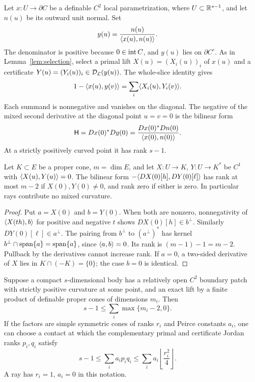 Let $x:U\to\partial C$ be a definable $C^2$ local parametrization, where
$U\subset\mathbb R^{s-1}$, and let $n(u)$ be its outward unit normal. Set
\[
 y(u)=\frac{n(u)}{\langle x(u),n(u)\rangle}.
\]
The denominator is positive because $0\in\operatorname{int} C$, and $y(u)$ lies on
$\partial C^\circ$. As in Lemma~\ref{lem:selection}, select a primal
lift $X(u)=(X_i(u))_i$ of $x(u)$ and a certificate
$Y(u)=(Y_i(u))_i\in\mathcal D_{\mathcal L}(y(u))$. The whole-slice identity gives
\begin{equation}\label{eq:local-slack}
 1-\langle x(u),y(v)\rangle=\sum_i\langle X_i(u),Y_i(v)\rangle.
\end{equation}
Each summand is nonnegative and vanishes on the diagonal. The negative of
the mixed second derivative at the diagonal point $u=v=0$ is the bilinear
form
\begin{equation}\label{eq:mixed-curvature}
 \mathsf H=Dx(0)^*Dy(0)
 =\frac{Dx(0)^*Dn(0)}{\langle x(0),n(0)\rangle}.
\end{equation}
At a strictly positively curved point it has rank $s-1$.

\begin{lemma}\label{lem:universal-channel}
Let $K\subset E$ be a proper cone, $m=\dim E$, and let
$X:U\to K$, $Y:U\to K^*$ be $C^1$ with
$\langle X(u),Y(u)\rangle=0$. The bilinear form
$-\langle DX(0)[h],DY(0)[\ell]\rangle$ has rank at most $m-2$ if
$X(0),Y(0)\ne0$, and rank zero if either is zero. In particular rays
contribute no mixed curvature.
\end{lemma}
\begin{proof}
Put $a=X(0)$ and $b=Y(0)$. When both are nonzero, nonnegativity of
$\langle X(th),b\rangle$ for positive and negative $t$ shows $DX(0)[h]\in b^\perp$.
Similarly $DY(0)[\ell]\in a^\perp$. The pairing from $b^\perp$ to
$(a^\perp)^*$ has kernel
$b^\perp\cap\operatorname{span}\{a\}=\operatorname{span}\{a\}$, since $\langle a,b\rangle=0$.
Its rank is $(m-1)-1=m-2$. Pullback by the derivatives cannot increase
rank. If $a=0$, a two-sided derivative of $X$ lies in $K\cap(-K)=\{0\}$;
the case $b=0$ is identical.
\end{proof}

\begin{theorem}\label{thm:curvature}
Suppose a compact $s$-dimensional body has a relatively open $C^2$
boundary patch with strictly positive curvature at some point, and an
exact lift by a finite product of definable proper cones of dimensions
$m_i$. Then
\begin{equation}\label{eq:universal-capacity}
 s-1\leq\sum_i\max\{m_i-2,0\}.
\end{equation}
If the factors are simple symmetric cones of ranks $r_i$ and Peirce
constants $a_i$, one can choose a contact at which the complementary
primal and certificate Jordan ranks $p_i,q_i$ satisfy
\begin{equation}\label{eq:jordan-capacity}
 s-1\leq\sum_i a_ip_iq_i
 \leq\sum_i a_i\left\lfloor\frac{r_i^2}{4}\right\rfloor.
\end{equation}
A ray has $r_i=1$, $a_i=0$ in this notation.
\end{theorem}

